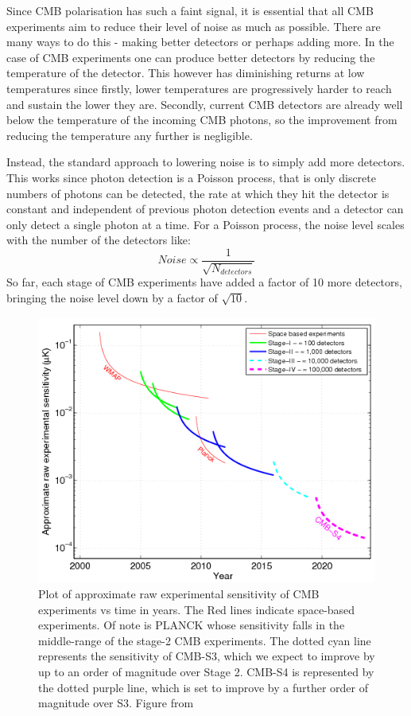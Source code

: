 Since CMB polarisation has such a faint signal, it is essential that all CMB experiments aim to reduce their level of noise as much as possible. There are many ways to do this - making better detectors or perhaps adding more. In the case of CMB experiments one can produce better detectors by reducing the temperature of the detector. This however has diminishing returns at low temperatures since firstly, lower temperatures are progressively harder to reach and sustain the lower they are. Secondly, current CMB detectors are already well below the temperature of the incoming CMB photons, so the improvement from reducing the temperature any further is negligible.

Instead, the standard approach to lowering noise is to simply add more detectors. This works since photon detection is a Poisson process, that is only discrete numbers of photons can be detected, the rate at which they hit the detector is constant and independent of previous photon detection events and a detector can only detect a single photon at a time. For a Poisson process, the noise level scales with the number of the detectors like: $$ Noise \propto \frac{1}{\sqrt{N_{detectors}}}$$ So far, each stage of CMB experiments have added a factor of 10 more detectors, bringing the noise level down by a factor of $\sqrt{10}$.

\begin{figure}[t]
\centering
\includegraphics[scale=0.75]{images/experiments.png} 
\caption{Plot of approximate raw experimental sensitivity of CMB experiments vs time in years. The Red lines indicate space-based experiments. Of note is PLANCK whose sensitivity falls in the middle-range of the stage-2 CMB experiments. The dotted cyan line represents the sensitivity of CMB-S3, which we expect to improve by up to an order of magnitude over Stage 2. CMB-S4 is represented by the dotted purple line, which is set to improve by a further order of magnitude over S3. Figure from \citet{Abazajian:2013oma}}
\end{figure}

